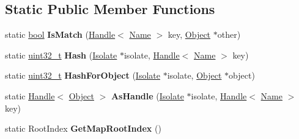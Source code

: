 \subsection*{Static Public Member Functions}
\begin{DoxyCompactItemize}
\item 
\mbox{\label{classv8_1_1internal_1_1NameDictionaryShape_aa61a249500560f11c019f04c63b842bd}} 
static \mbox{\hyperlink{classbool}{bool}} {\bfseries Is\+Match} (\mbox{\hyperlink{classv8_1_1internal_1_1Handle}{Handle}}$<$ \mbox{\hyperlink{classv8_1_1internal_1_1Name}{Name}} $>$ key, \mbox{\hyperlink{classv8_1_1internal_1_1Object}{Object}} $\ast$other)
\item 
\mbox{\label{classv8_1_1internal_1_1NameDictionaryShape_a2be4b50d70e438aae03fc01bd92483b5}} 
static \mbox{\hyperlink{classuint32__t}{uint32\+\_\+t}} {\bfseries Hash} (\mbox{\hyperlink{classv8_1_1internal_1_1Isolate}{Isolate}} $\ast$isolate, \mbox{\hyperlink{classv8_1_1internal_1_1Handle}{Handle}}$<$ \mbox{\hyperlink{classv8_1_1internal_1_1Name}{Name}} $>$ key)
\item 
\mbox{\label{classv8_1_1internal_1_1NameDictionaryShape_acf90971fa73da3fef49f32953ac47357}} 
static \mbox{\hyperlink{classuint32__t}{uint32\+\_\+t}} {\bfseries Hash\+For\+Object} (\mbox{\hyperlink{classv8_1_1internal_1_1Isolate}{Isolate}} $\ast$isolate, \mbox{\hyperlink{classv8_1_1internal_1_1Object}{Object}} $\ast$object)
\item 
\mbox{\label{classv8_1_1internal_1_1NameDictionaryShape_a96d68e9a269f548351734be0ae2baf31}} 
static \mbox{\hyperlink{classv8_1_1internal_1_1Handle}{Handle}}$<$ \mbox{\hyperlink{classv8_1_1internal_1_1Object}{Object}} $>$ {\bfseries As\+Handle} (\mbox{\hyperlink{classv8_1_1internal_1_1Isolate}{Isolate}} $\ast$isolate, \mbox{\hyperlink{classv8_1_1internal_1_1Handle}{Handle}}$<$ \mbox{\hyperlink{classv8_1_1internal_1_1Name}{Name}} $>$ key)
\item 
\mbox{\label{classv8_1_1internal_1_1NameDictionaryShape_a42504c80cfb008ebd255acf2e55477e4}} 
static Root\+Index {\bfseries Get\+Map\+Root\+Index} ()
\end{DoxyCompactItemize}
